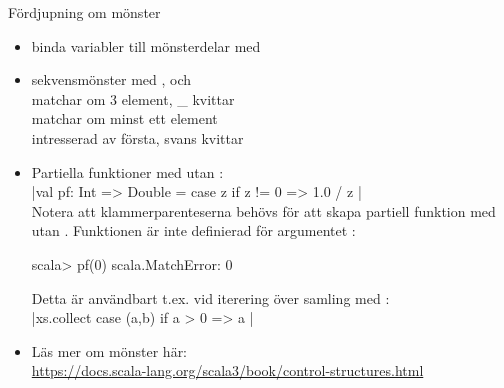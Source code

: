 \begin{Slide}{Fördjupning om mönster}\SlideFontSmall
\begin{itemize}
\item binda variabler till mönsterdelar med  \\

\item sekvensmönster med \code{_},  och \code{_*} 
\\   matchar om 3 element, \_ kvittar
\\   matchar om minst ett element
\\   intresserad av första, svans kvittar

\item Partiella funktioner med  utan :\\ \code|val pf: Int => Double = { case z if z != 0 => 1.0 / z }| \\ Notera att klammerparenteserna behövs för att skapa partiell funktion med  utan . Funktionen är inte definierad för argumentet :

\begin{REPLsmall}
scala> pf(0)                         
scala.MatchError: 0 
\end{REPLsmall}
Detta är användbart t.ex. vid iterering över samling med : \\\code|xs.collect{ case (a,b) if a > 0 => a }|  
\item Läs mer om mönster här: \\\url{https://docs.scala-lang.org/scala3/book/control-structures.html}




\end{itemize}
\end{Slide}


